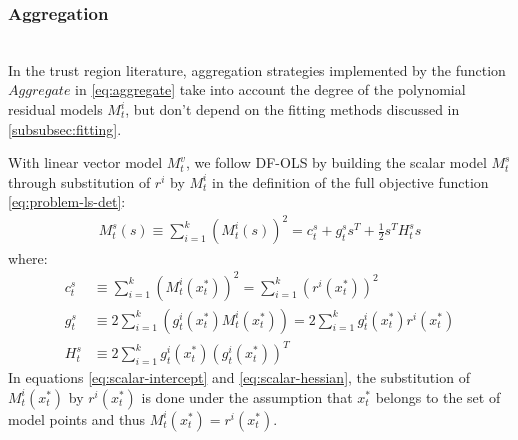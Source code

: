 \subsubsection{Aggregation}
\label{subsubsec:aggregation}
\hfill\\





In the trust region literature, aggregation strategies implemented by the function $Aggregate$ in \ref{eq:aggregate} take into account the degree of the polynomial residual models $M_t^i$, but don't depend on the fitting methods discussed in \ref{subsubsec:fitting}.

With linear vector model $M_t^v$, we follow DF-OLS by building the scalar model $M_t^s$ through substitution of $r^i$ by $M_t^i$ in the definition of the full objective function \ref{eq:problem-ls-det}:
\begin{align}
    M_t^s(s)\equiv\sum\limits_{i=1}^k(M_t^i(s))^2 =  c_t^s+g^s_ts^T+\frac{1}{2}s^TH^s_ts
\end{align}
where:
\begin{align}
    c_t^s &\equiv\sum\limits_{i=1}^k(M_t^i(x_t^*))^2 = \sum\limits_{i=1}^k(r^i(x_t^*))^2\label{eq:scalar-intercept}\\
     g^s_t&\equiv2\sum\limits_{i=1}^k(g_t^i(x_t^*)M_t^i(x_t^*))=2\sum\limits_{i=1}^kg_t^i(x_t^*)r^i(x_t^*)\label{eq:scalar-gradient}\\
     H_t^s&\equiv2\sum\limits_{i=1}^kg_t^i(x_t^*)(g_t^i(x_t^*))^T\label{eq:scalar-hessian}
\end{align}
In equations \ref{eq:scalar-intercept} and \ref{eq:scalar-hessian}, the substitution of $M_t^i(x_t^*)$ by $r^i(x_t^*)$ is done under the assumption that $x_t^*$ belongs to the set of model points and thus $M_t^i(x_t^*)=r^i(x_t^*)$.

